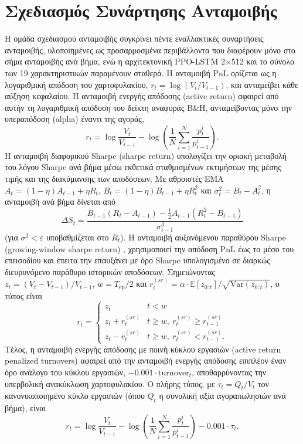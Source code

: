 \section{Σχεδιασμός Συνάρτησης Ανταμοιβής}
\label{sec:exp-reward}

Η ομάδα σχεδιασμού ανταμοιβής συγκρίνει πέντε εναλλακτικές συναρτήσεις ανταμοιβής, υλοποιημένες
ως προσαρμοσμένα περιβάλλοντα που διαφέρουν μόνο στο σήμα ανταμοιβής ανά βήμα, ενώ η αρχιτεκτονική
PPO-LSTM 2$\times$512 και το σύνολο των 19 χαρακτηριστικών παραμένουν σταθερά. Η ανταμοιβή PnL ορίζεται ως η
λογαριθμική απόδοση του χαρτοφυλακίου, $r_t = \log(V_t / V_{t-1})$, και ανταμείβει κάθε αύξηση
κεφαλαίου. Η ανταμοιβή ενεργής απόδοσης (active return) αφαιρεί από αυτήν τη λογαριθμική απόδοση
του δείκτη αναφοράς B\&H, ανταμείβοντας μόνο την υπεραπόδοση (alpha) έναντι της αγοράς,
\[
  r_t = \log\frac{V_t}{V_{t-1}} - \log\!\left(\frac{1}{N}\sum_{i=1}^{N}\frac{p^i_t}{p^i_{t-1}}\right).
\]
Η ανταμοιβή διαφορικού Sharpe (sharpe return) υπολογίζει την οριακή μεταβολή του λόγου Sharpe
ανά βήμα μέσω εκθετικά σταθμισμένων εκτιμήσεων της μέσης τιμής και της διακύμανσης των αποδόσεων.
Με αθροιστές EMA $A_t = (1-\eta)A_{t-1} + \eta R_t$, $B_t = (1-\eta)B_{t-1} + \eta R_t^2$ και
$\sigma_t^2 = B_t - A_t^2$, η ανταμοιβή ανά βήμα δίνεται από
\[
  \Delta S_t = \frac{B_{t-1}(R_t - A_{t-1}) - \tfrac{1}{2}A_{t-1}(R_t^2 - B_{t-1})}{\sigma_{t-1}^3}
\]
(για $\sigma^2 < \varepsilon$ υποβαθμίζεται στο $R_t$). Η ανταμοιβή αυξανόμενου παραθύρου Sharpe 
(growing-window sharpe return) \cite{rodinos2023sharpe}, 
χρησιμοποιεί την απόδοση PnL έως το μέσο του επεισοδίου και έπειτα
την επαυξάνει με όρο Sharpe υπολογισμένο σε διαρκώς διευρυνόμενο παράθυρο ιστορικών αποδόσεων.
Σημειώνοντας $z_t = (V_t - V_{t-1})/V_{t-1}$, $w = T_{\mathrm{ep}}/2$ και
$r^{(sr)}_t = \alpha \cdot \mathbb{E}[z_{0:t}] / \sqrt{\mathrm{Var}(z_{0:t})}$, ο τύπος είναι
\[
  r_t = \begin{cases}
    z_t & t < w \\
    z_t + r^{(sr)}_t & t \ge w,\ r^{(sr)}_t \ge r^{(sr)}_{t-1} \\
    z_t - r^{(sr)}_t & t \ge w,\ r^{(sr)}_t < r^{(sr)}_{t-1}.
  \end{cases}
\]
Τέλος, η ανταμοιβή ενεργής απόδοσης με ποινή κύκλου εργασιών (active return penalized turnovers) αφαιρεί 
από την ανταμοιβή ενεργής απόδοσης επιπλέον έναν όρο ανάλογο
του κύκλου εργασιών, $-0{.}001 \cdot \mathrm{turnover}_t$, αποθαρρύνοντας την υπερβολική ανακύκλωση
χαρτοφυλακίου. Ο πλήρης τύπος, με $\tau_t = Q_t / V_t$ τον κανονικοποιημένο κύκλο εργασιών
(όπου $Q_t$ η συνολική αξία αγοραπωλησιών ανά βήμα), είναι
\[
  r_t = \log\frac{V_t}{V_{t-1}} - \log\!\left(\frac{1}{N}\sum_{i=1}^{N}\frac{p^i_t}{p^i_{t-1}}\right)
        - 0{.}001\cdot\tau_t.
\]

